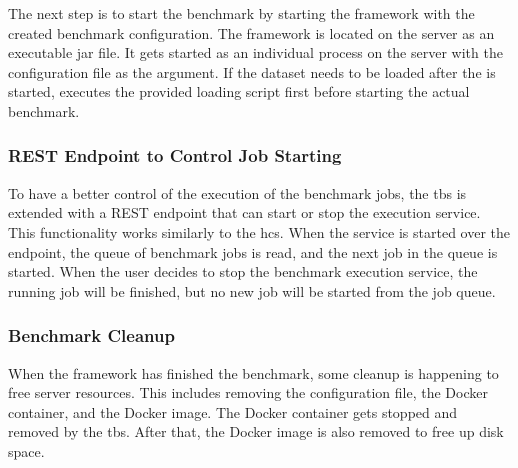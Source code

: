 The next step is to start the benchmark by starting the \iguana{} framework with the created benchmark configuration.
The \iguana{} framework is located on the server as an executable jar file.
It gets started as an individual process on the server with the configuration file as the argument.
If the dataset needs to be loaded after the \ts{} is started, \iguana{} executes the provided loading script first before starting the actual benchmark.


\subsubsection{REST Endpoint to Control Job Starting}
To have a better control of the execution of the benchmark jobs, the \ac{tbs} is extended with a REST endpoint that can start or stop the execution service.
This functionality works similarly to the \ac{hcs}.
When the service is started over the endpoint, the queue of benchmark jobs is read, and the next job in the queue is started.
When the user decides to stop the benchmark execution service, the running job will be finished, but no new job will be started from the job queue.


\subsubsection{Benchmark Cleanup}
When the \iguana{} framework has finished the benchmark, some cleanup is happening to free server resources.
This includes removing the \iguana{} configuration file, the Docker container, and the Docker image.
The Docker container gets stopped and removed by the \ac{tbs}.
After that, the Docker image is also removed to free up disk space.
